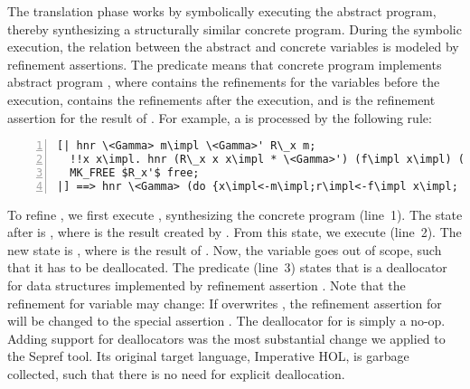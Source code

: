 \documentclass[a4paper,oribibl,envcountsame]{llncs}
\begin{document}
The translation phase works by symbolically executing the abstract program, thereby synthesizing a structurally similar concrete program.
During the symbolic execution, the relation between the abstract and concrete variables is modeled by refinement assertions. 
The predicate  means that concrete program  implements abstract program ,
where  contains the refinements for the variables before the execution,  contains the 
refinements after the execution, and  is the refinement assertion for the result of . For example, a  is 
processed by the following rule:
\begin{lstlisting}[numbers=left]
[| hnr \<Gamma> m\impl \<Gamma>' R\_x m;
  !!x x\impl. hnr (R\_x x x\impl * \<Gamma>') (f\impl x\impl) ($R_x'$ x x\impl * \<Gamma>'') R\_y (f x);
  MK_FREE $R_x'$ free;
|] ==> hnr \<Gamma> (do {x\impl<-m\impl;r\impl<-f\impl x\impl; free x\impl; return r\impl}) \<Gamma>'' R\_y (do {x<-m; f x})
\end{lstlisting}
To refine , we first execute , synthesizing the concrete program  (line~1).
The state after  is , where  is the result created by .
From this state, we execute  (line~2). The new state is , where  is the result of .
Now, the variable  goes out of scope, such that it has to be deallocated. 
The predicate  (line~3) states that 
 is a deallocator for data structures implemented by refinement assertion . 
Note that the refinement for variable  may change: If  overwrites ,
the refinement assertion for  will be changed to the special assertion . 
The deallocator for  is simply a no-op.
%
Adding support for deallocators was the most substantial change we applied to the Sepref tool. Its original target 
language, Imperative HOL, is garbage collected, such that there is no need for explicit deallocation.
\end{document}
